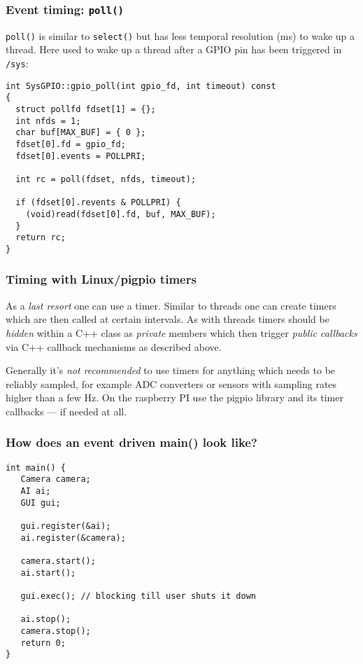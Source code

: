 \documentclass[xcolor=dvipsnames]{beamer}
\begin{document}
\begin{frame}[fragile]
  \frametitle{Event timing: \texttt{poll()}}
  \texttt{poll()} is similar to \texttt{select()} but
  has less temporal resolution (ms) to wake up a thread.
  Here used to wake up a thread after a GPIO pin has been
  triggered in \texttt{/sys}:
\begin{verbatim}
int SysGPIO::gpio_poll(int gpio_fd, int timeout) const
{
  struct pollfd fdset[1] = {};
  int nfds = 1;
  char buf[MAX_BUF] = { 0 };
  fdset[0].fd = gpio_fd;
  fdset[0].events = POLLPRI;

  int rc = poll(fdset, nfds, timeout);

  if (fdset[0].revents & POLLPRI) {
    (void)read(fdset[0].fd, buf, MAX_BUF);
  }
  return rc;
}
\end{verbatim}
\end{frame}


\begin{frame}[fragile]
\frametitle{Timing with Linux/pigpio timers}
As a \textsl{last resort} one can use a timer. Similar to threads one can
create timers which are then called at certain intervals. As with threads
timers should be \textsl{hidden} within a C++ class as
\textsl{private} members which then trigger \textsl{public callbacks}
via C++ callback mechanisms as described above.

Generally it's \textsl{not recommended}
to use timers for anything which needs to be reliably sampled, for
example ADC converters or sensors with sampling rates higher than a
few Hz. On the raspberry PI use the pigpio library and its timer
callbacks --- if needed at all.
\end{frame}


\begin{frame}[fragile]
  \frametitle{How does an event driven main() look like?}
 \begin{verbatim}
int main() {
   Camera camera;
   AI ai;
   GUI gui;
 
   gui.register(&ai);
   ai.register(&camera);

   camera.start();
   ai.start();

   gui.exec(); // blocking till user shuts it down

   ai.stop();
   camera.stop();
   return 0;
} 
\end{verbatim}
\end{frame}
\end{document}
